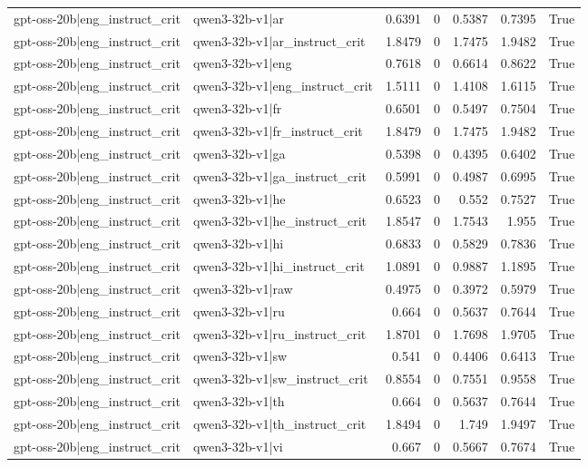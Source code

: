 \begin{table}
\begin{tabular}{l l r r r r l}
gpt-oss-20b|eng_instruct_crit & qwen3-32b-v1|ar & 0.6391 & 0 & 0.5387 & 0.7395 & True \\
gpt-oss-20b|eng_instruct_crit & qwen3-32b-v1|ar_instruct_crit & 1.8479 & 0 & 1.7475 & 1.9482 & True \\
gpt-oss-20b|eng_instruct_crit & qwen3-32b-v1|eng & 0.7618 & 0 & 0.6614 & 0.8622 & True \\
gpt-oss-20b|eng_instruct_crit & qwen3-32b-v1|eng_instruct_crit & 1.5111 & 0 & 1.4108 & 1.6115 & True \\
gpt-oss-20b|eng_instruct_crit & qwen3-32b-v1|fr & 0.6501 & 0 & 0.5497 & 0.7504 & True \\
gpt-oss-20b|eng_instruct_crit & qwen3-32b-v1|fr_instruct_crit & 1.8479 & 0 & 1.7475 & 1.9482 & True \\
gpt-oss-20b|eng_instruct_crit & qwen3-32b-v1|ga & 0.5398 & 0 & 0.4395 & 0.6402 & True \\
gpt-oss-20b|eng_instruct_crit & qwen3-32b-v1|ga_instruct_crit & 0.5991 & 0 & 0.4987 & 0.6995 & True \\
gpt-oss-20b|eng_instruct_crit & qwen3-32b-v1|he & 0.6523 & 0 & 0.552 & 0.7527 & True \\
gpt-oss-20b|eng_instruct_crit & qwen3-32b-v1|he_instruct_crit & 1.8547 & 0 & 1.7543 & 1.955 & True \\
gpt-oss-20b|eng_instruct_crit & qwen3-32b-v1|hi & 0.6833 & 0 & 0.5829 & 0.7836 & True \\
gpt-oss-20b|eng_instruct_crit & qwen3-32b-v1|hi_instruct_crit & 1.0891 & 0 & 0.9887 & 1.1895 & True \\
gpt-oss-20b|eng_instruct_crit & qwen3-32b-v1|raw & 0.4975 & 0 & 0.3972 & 0.5979 & True \\
gpt-oss-20b|eng_instruct_crit & qwen3-32b-v1|ru & 0.664 & 0 & 0.5637 & 0.7644 & True \\
gpt-oss-20b|eng_instruct_crit & qwen3-32b-v1|ru_instruct_crit & 1.8701 & 0 & 1.7698 & 1.9705 & True \\
gpt-oss-20b|eng_instruct_crit & qwen3-32b-v1|sw & 0.541 & 0 & 0.4406 & 0.6413 & True \\
gpt-oss-20b|eng_instruct_crit & qwen3-32b-v1|sw_instruct_crit & 0.8554 & 0 & 0.7551 & 0.9558 & True \\
gpt-oss-20b|eng_instruct_crit & qwen3-32b-v1|th & 0.664 & 0 & 0.5637 & 0.7644 & True \\
gpt-oss-20b|eng_instruct_crit & qwen3-32b-v1|th_instruct_crit & 1.8494 & 0 & 1.749 & 1.9497 & True \\
gpt-oss-20b|eng_instruct_crit & qwen3-32b-v1|vi & 0.667 & 0 & 0.5667 & 0.7674 & True \\

\end{tabular}
\end{table}
